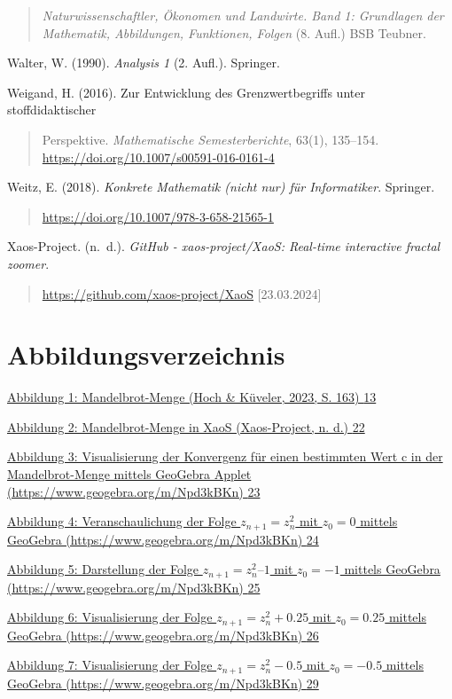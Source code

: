\documentclass[a4paper, 12pt]{book}
\begin{document}
\begin{quote}
\emph{Naturwissenschaftler, Ökonomen und Landwirte. Band 1: Grundlagen
der Mathematik, Abbildungen, Funktionen, Folgen} (8. Aufl.) BSB Teubner.
\end{quote}

Walter, W. (1990). \emph{Analysis 1} (2. Aufl.). Springer.

Weigand, H. (2016). Zur Entwicklung des Grenzwertbegriffs unter
stoffdidaktischer

\begin{quote}
Perspektive. \emph{Mathematische Semesterberichte}, 63(1), 135--154.
\url{https://doi.org/10.1007/s00591-016-0161-4}
\end{quote}

Weitz, E. (2018). \emph{Konkrete Mathematik (nicht nur) für
Informatiker}. Springer.

\begin{quote}
\url{https://doi.org/10.1007/978-3-658-21565-1}
\end{quote}

Xaos-Project. (n.~d.). \emph{GitHub - xaos-project/XaoS: Real-time
interactive fractal zoomer}.

\begin{quote}
\url{https://github.com/xaos-project/XaoS} {[}23.03.2024{]}
\end{quote}

\section{Abbildungsverzeichnis}\label{abbildungsverzeichnis}

\protect\hyperlink{_Toc167901651}{Abbildung 1: Mandelbrot-Menge (Hoch \&
Küveler, 2023, S. 163) \protect\hyperlink{_Toc167901651}{13}}

\protect\hyperlink{_Toc167901652}{Abbildung 2: Mandelbrot-Menge in XaoS
(Xaos-Project, n. d.) \protect\hyperlink{_Toc167901652}{22}}

\protect\hyperlink{_Toc167901653}{Abbildung 3: Visualisierung der
Konvergenz für einen bestimmten Wert c in der Mandelbrot-Menge mittels
GeoGebra Applet (https://www.geogebra.org/m/Npd3kBKn)
\protect\hyperlink{_Toc167901653}{23}}

\protect\hyperlink{_Toc167901654}{Abbildung 4: Veranschaulichung der
Folge \(z_{n + 1} = z_{n}^{2}\) mit \(z_{0} = 0\) mittels
GeoGebra (https://www.geogebra.org/m/Npd3kBKn)
\protect\hyperlink{_Toc167901654}{24}}

\protect\hyperlink{_Toc167901655}{Abbildung 5: Darstellung der Folge
\(z_{n + 1} = z_{n}^{2}–1\) mit \({z}_{0} =  - 1\) mittels
GeoGebra (https://www.geogebra.org/m/Npd3kBKn)
\protect\hyperlink{_Toc167901655}{25}}

\protect\hyperlink{_Toc167901656}{Abbildung 6: Visualisierung der Folge
\(z_{n + 1} = z_{n}^{2} + 0.25\) mit \(z_{0} = 0.25\)
mittels GeoGebra (https://www.geogebra.org/m/Npd3kBKn)
\protect\hyperlink{_Toc167901656}{26}}

\protect\hyperlink{_Toc167901657}{Abbildung 7: Visualisierung der Folge
\(z_{n + 1} = z_{n}^{2} - 0.5\) mit \(z_{0} =  - 0.5\)
mittels GeoGebra (https://www.geogebra.org/m/Npd3kBKn)
\protect\hyperlink{_Toc167901657}{29}}
\end{document}
